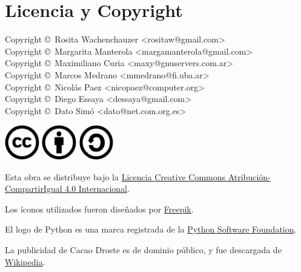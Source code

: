 
\chapter*{Licencia y Copyright}

{\noindent
Copyright \copyright\ Rosita Wachenchauzer <rositaw@gmail.com> \\
Copyright \copyright\ Margarita Manterola <margamanterola@gmail.com> \\
Copyright \copyright\ Maximiliano Curia <maxy@gnuservers.com.ar> \\
Copyright \copyright\ Marcos Medrano <mmedrano@fi.uba.ar> \\
Copyright \copyright\ Nicolás Paez <nicopaez@computer.org> \\
Copyright \copyright\ Diego Essaya <dessaya@gmail.com> \\
Copyright \copyright\ Dato Simó <dato@net.com.org.es> \\
}

\begin{center}
\noindent
\includegraphics[height=1.5cm]{graficos/cc/cc}
\hspace{0.5cm}
\includegraphics[height=1.5cm]{graficos/cc/by}
\hspace{0.5cm}
\includegraphics[height=1.5cm]{graficos/cc/sa}
\end{center}

Esta obra se distribuye bajo la
\href{http://creativecommons.org/licenses/by-sa/4.0/deed.es}{Licencia Creative
Commons Atribución-CompartirIgual 4.0 Internacional}.

Los íconos utilizados fueron diseñados por
\href{http://www.freepik.com/}{Freepik}.

El logo de Python es una marca registrada de la
\href{https://www.python.org/psf/}{Python Software Foundation}.

La publicidad de Cacao Droste es de dominio público, y fue descargada de
\href{http://en.wikipedia.org/wiki/Image:Droste.jpg}{Wikipedia}.
